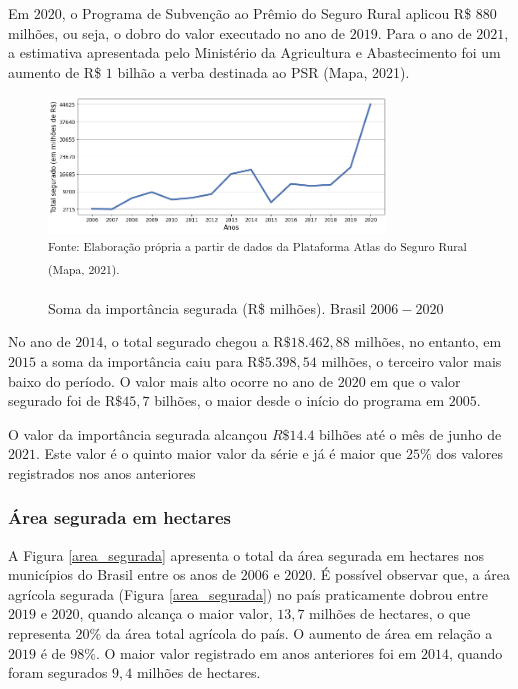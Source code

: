 Em $2020$, o Programa de Subvenção ao Prêmio do Seguro Rural aplicou R\$ $880$ milhões, ou seja, o dobro do valor executado no ano de  $2019$. Para o ano de $2021$, a estimativa apresentada pelo Ministério da Agricultura e Abastecimento foi um aumento de R\$ $1$ bilhão a verba destinada ao PSR (Mapa, 2021).

\begin{figure}[H]
	\centering
	\caption{Soma da importância segurada (R\$ milhões). Brasil $2006 - 2020$}
	\includegraphics[width=0.8\textwidth]{figuras/total_segurado_mil.png}\\
	\small \textsuperscript {Fonte: Elaboração própria a partir de dados da Plataforma Atlas do Seguro Rural (Mapa, 2021).}
    \label{total_segurado_mil}
\end{figure}

No ano de $2014$, o total segurado chegou a R$\$18.462,88$ milhões, no entanto, em $2015$ a soma da importância caiu para R$\$5.398,54$ milhões, o terceiro valor mais baixo do período. O valor mais alto ocorre no ano de $2020$ em que o valor segurado foi de R$\$45,7$ bilhões, o maior desde o início do programa em $2005$.

O valor da importância segurada alcançou $R\$14.4$ bilhões até o mês de junho de $2021$. Este valor é o quinto maior valor da série e já é maior que $25\%$ dos valores registrados nos anos anteriores 

\subsubsection{Área segurada em hectares}

A Figura \ref{area_segurada} apresenta o total da área segurada em hectares nos municípios do Brasil entre os anos de  $2006$ e  $2020$. É possível observar que, a área agrícola segurada (Figura \ref{area_segurada}) no país praticamente dobrou entre $2019$ e $2020$, quando alcança o maior valor, $13,7$ milhões de hectares, o que representa $20\%$ da área total agrícola do país. O aumento de área em relação a $2019$ é de $98\%$. O maior valor registrado em anos anteriores foi em $2014$, quando foram segurados $9,4$ milhões de hectares. 

